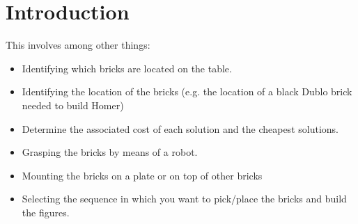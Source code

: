 \chapter{Introduction}

This involves among other things:
\begin{itemize}
    \item Identifying which bricks are located on the table.
    \item Identifying the location of the bricks (e.g. the location of a black Dublo brick needed to build Homer)
    \item Determine the associated cost of each solution and the cheapest solutions.
    \item Grasping the bricks by means of a robot.
    \item Mounting the bricks on a plate or on top of other bricks
    \item Selecting the sequence in which you want to pick/place the bricks and build the figures.
\end{itemize}